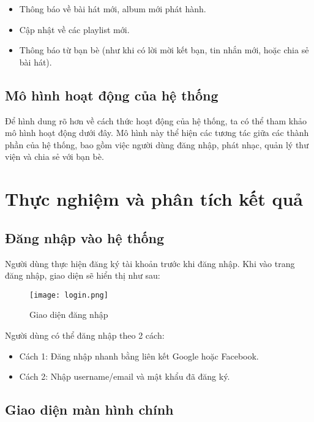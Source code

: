 \documentclass[a4paper]{article}
\begin{document}
\begin{itemize}
    \item Thông báo về bài hát mới, album mới phát hành.
    \item Cập nhật về các playlist mới.
    \item Thông báo từ bạn bè (như khi có lời mời kết bạn, tin nhắn mới, hoặc chia sẻ bài hát).
\end{itemize}

\subsection{Mô hình hoạt động của hệ thống}
Để hình dung rõ hơn về cách thức hoạt động của hệ thống, ta có thể tham khảo mô hình hoạt động dưới đây. Mô hình này thể hiện các tương tác giữa các thành phần của hệ thống, bao gồm việc người dùng đăng nhập, phát nhạc, quản lý thư viện và chia sẻ với bạn bè.


\newpage

\newpage
\section {Thực nghiệm và phân tích kết quả}

\subsection{Đăng nhập vào hệ thống}

Người dùng thực hiện đăng ký tài khoản trước khi đăng nhập.
Khi vào trang đăng nhập, giao diện sẽ hiển thị như sau:

\begin{figure}[!htb]
    \centering
    \texttt{[image: login.png]}
    \caption{Giao diện đăng nhập}
    \label{fig:login}
\end{figure}

Người dùng có thể đăng nhập theo 2 cách:

\begin{itemize}
    \item Cách 1: Đăng nhập nhanh bằng liên kết Google hoặc Facebook.
    \item Cách 2: Nhập username/email và mật khẩu đã đăng ký.
\end{itemize}

\subsection{Giao diện màn hình chính}
\end{document}

